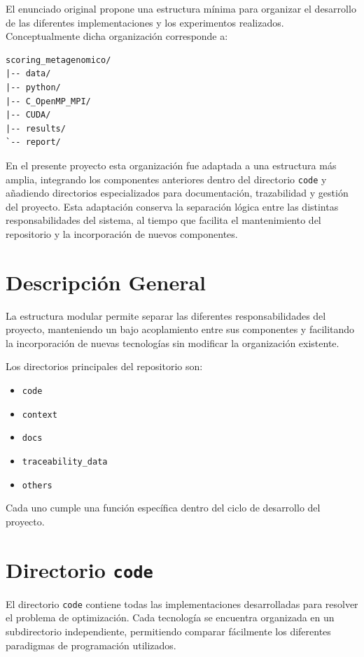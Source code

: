 El enunciado original propone una estructura mínima para organizar el desarrollo de las diferentes implementaciones y los experimentos realizados. Conceptualmente dicha organización corresponde a:

\begin{lstlisting}[language={}]
scoring_metagenomico/
|-- data/
|-- python/
|-- C_OpenMP_MPI/
|-- CUDA/
|-- results/
`-- report/
\end{lstlisting}

En el presente proyecto esta organización fue adaptada a una estructura más amplia, integrando los componentes anteriores dentro del directorio \texttt{code} y añadiendo directorios especializados para documentación, trazabilidad y gestión del proyecto. Esta adaptación conserva la separación lógica entre las distintas responsabilidades del sistema, al tiempo que facilita el mantenimiento del repositorio y la incorporación de nuevos componentes.

\section{Descripción General}

La estructura modular permite separar las diferentes responsabilidades del proyecto, manteniendo un bajo acoplamiento entre sus componentes y facilitando la incorporación de nuevas tecnologías sin modificar la organización existente.

Los directorios principales del repositorio son:

\begin{itemize}
    \item \texttt{code}
    \item \texttt{context}
    \item \texttt{docs}
    \item \texttt{traceability\_data}
    \item \texttt{others}
\end{itemize}

Cada uno cumple una función específica dentro del ciclo de desarrollo del proyecto.

\section{Directorio \texttt{code}}

El directorio \texttt{code} contiene todas las implementaciones desarrolladas para resolver el problema de optimización. Cada tecnología se encuentra organizada en un subdirectorio independiente, permitiendo comparar fácilmente los diferentes paradigmas de programación utilizados.

